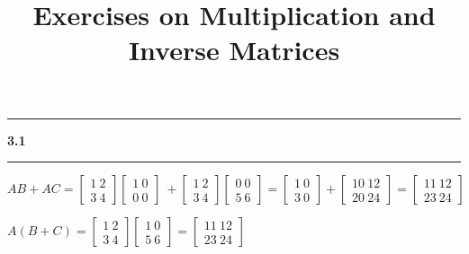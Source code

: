 \documentclass[11pt]{article}
\newcommand\question[2]{\vspace{.25in}\hrule\textbf{#1 #2}\vspace{.5em}\hrule\vspace{.10in}}
\begin{document}
\raggedright
\newcommand\NAME{Haiying Cui}  %
\newcommand\ANDREWID{Christy}     %
\newcommand\HWNUM{3}              %

\title{Exercises on Multiplication and Inverse Matrices}
\maketitle

\question{3.1}{}
\(AB + AC = \begin{bmatrix} 1 \ 2 \\ 3 \ 4 \end{bmatrix}\begin{bmatrix} 1 \ 0 \\ 0 \ 0 \end{bmatrix}\ + \begin{bmatrix} 1 \ 2 \\ 3 \ 4 \end{bmatrix}\begin{bmatrix} 0 \ 0 \\ 5 \ 6 \end{bmatrix} = \begin{bmatrix} 1 \ 0 \\ 3 \ 0 \end{bmatrix} + \begin{bmatrix} 10 \ 12 \\ 20 \ 24 \end{bmatrix} = \begin{bmatrix} 11 \ 12 \\ 23 \ 24 \end{bmatrix}\)

\(A(B + C) = \begin{bmatrix} 1 \ 2 \\ 3 \ 4 \end{bmatrix}\begin{bmatrix} 1 \ 0 \\ 5 \ 6 \end{bmatrix} = \begin{bmatrix} 11 \ 12 \\ 23 \ 24 \end{bmatrix}\)
\end{document}

